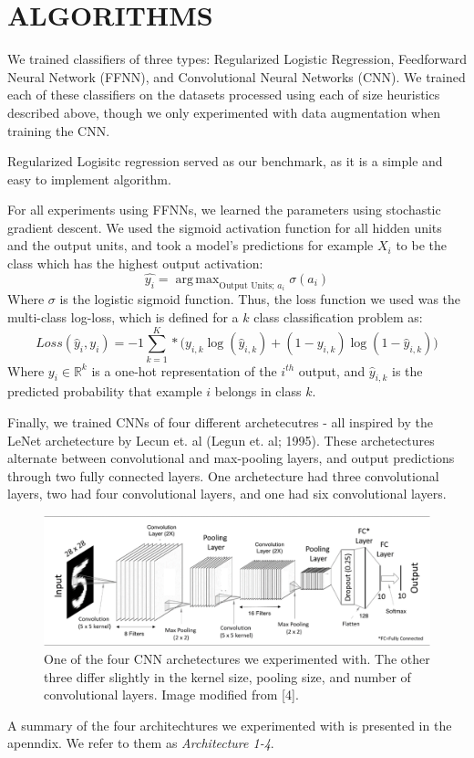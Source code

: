 \documentclass[letterpaper, 10 pt, conference]{ieeeconf}  %
\DeclareMathOperator*{\argmax}{arg\,max}
\begin{document}
\section{ALGORITHMS}

We trained classifiers of three types: Regularized Logistic Regression, Feedforward Neural Network (FFNN), and Convolutional Neural Networks (CNN). We trained each of these classifiers on the datasets processed using each of size heuristics described above, though we only experimented with data augmentation when training the CNN.

Regularized Logisitc regression served as our benchmark, as it is a simple and easy to implement algorithm. 

For all experiments using FFNNs, we learned the parameters using stochastic gradient descent. We used the sigmoid activation function for all hidden units and the output units, and took a model's predictions for example $X_i$ to be the class which has the highest output activation:
$$
\hat{y_i} = \argmax_{\text{Output Units; } a_i}{\sigma(a_i)}
$$
Where $\sigma$ is the logistic sigmoid function. Thus, the loss function we used was the multi-class log-loss, which is defined for a $k$ class classification problem as:
$$
Loss(\hat{y}_i, y_i) = -1\sum_{k = 1}^K*\big( y_{i,k}\log(\hat{y}_{i,k}) + (1 - y_{i,k})\log(1 - \hat{y}_{i,k}))
$$
Where $y_{i} \in \mathbb{R}^k$ is a one-hot representation of the $i^{th}$ output, and $\hat{y}_{i,k}$ is the predicted probability that example $i$ belongs in class $k$. 

Finally, we trained CNNs of four different archetecutres - all inspired by the LeNet archetecture by Lecun et. al (Legun et. al; 1995). These archetectures alternate between convolutional and max-pooling layers, and output predictions through two fully connected layers. One archetecture had three convolutional layers, two had four convolutional layers, and one had six convolutional layers. 
\begin{figure}[H]
      \centering
      \includegraphics[scale = .42]{conv4_arch}
		\centering
      \caption{One of the four CNN archetectures we experimented with. The other three differ slightly in the kernel size, pooling size, and number of convolutional layers. Image modified from [4]. }
      \label{figurelabel}
\end{figure}
A summary of the four architechtures we experimented with is presented in the apenndix. We refer to them as \emph{Architecture 1-4}. 
\end{document}
